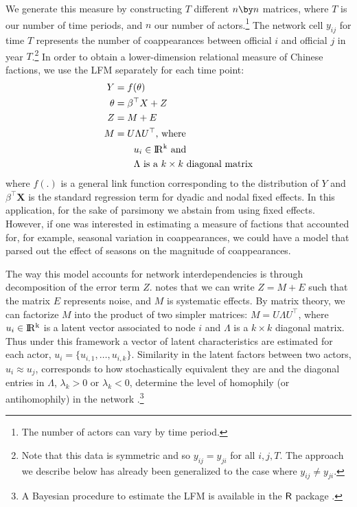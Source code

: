 \documentclass[12pt]{amsart}
\begin{document}
We generate this measure by constructing $T$ different $n \by n$ matrices, where $T$ is our number of time periods, and $n$ our number of actors.\footnote{The number of actors can vary by time period.} The network cell $y_{ij}$ for time $T$ represents the number of coappearances between official $i$ and official $j$ in year $T$.\footnote{Note that this data is symmetric and so $y_{ij} = y_{ji}$ for all $i,j,T$. The approach we describe below has already been generalized to the case where $y_{ij} \neq y_{ji}$.}
In order to obtain a lower-dimension relational measure of Chinese factions, we use the LFM separately for each time point: 
\begin{align*}
	Y &= f(\theta)\\
	\theta &= \beta^{\top} X + Z \\
	Z &= M + E  \\
	M &= U \Lambda U^{\top}\text{, where } \\
	&\qquad u_{i} \in \rm I\!R^{k} \text{ and } \\ 
	&\qquad \Lambda \text{ is a } k \times k \text{ diagonal matrix}
\end{align*}
where $f(.)$ is a general link function corresponding to the distribution of $Y$ and $\beta^{\top}\mathbf{X}$ is the standard regression term for dyadic and nodal fixed effects. In this application, for the sake of parsimony we abstain from using fixed effects. However, if one was interested in estimating a measure of factions that accounted for, for example, seasonal variation in coappearances, we could have a model that parsed out the effect of seasons on the magnitude of coappearances. 

The way this model accounts for network interdependencies is through decomposition of the error term $Z$. \citet{hoff:2009} notes that we can write $Z = M + E$ such that the matrix $E$ represents noise, and $M$ is systematic effects. By matrix theory, we can factorize $M$ into the product of two simpler matrices: $M = U \Lambda U^{\top}$, where $u_{i} \in \rm I\!R^{k}$ is a latent vector associated to node $i$ and $\Lambda$ is a $k \times k$ diagonal matrix. Thus under this framework a vector of latent characteristics are estimated for each actor, $u_{i} = \{u_{i,1}, \ldots, u_{i,k}\}$. Similarity in the latent factors between two actors, $u_{i} \approx u_{j}$, corresponds to how stochastically equivalent they are and the diagonal entries in $\Lambda$, $\lambda_{k} > 0 \text{ or } \lambda_{k} < 0$, determine the level of homophily (or antihomophily) in the network \citep{minhas:etal:2016:arxiv}.\footnote{A Bayesian procedure to estimate the LFM is available in the  $\sf{R}$ package \citep{amenpkg}. }
\end{document}
